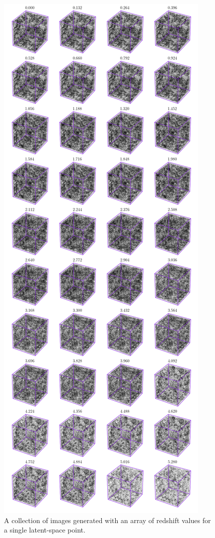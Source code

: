 \documentclass[twocolumn]{article}
\numberwithin{equation}{section}
\begin{document}
\begin{figure}[!ht]%
\includegraphics[width=\columnwidth]{figures/cubes/acgan3d_z_spec.png} %
\centering
\caption{A collection of images generated with an array of redshift values for a single latent-space point.}
\label{fig:acgan_interp}
\end{figure}
\end{document}
